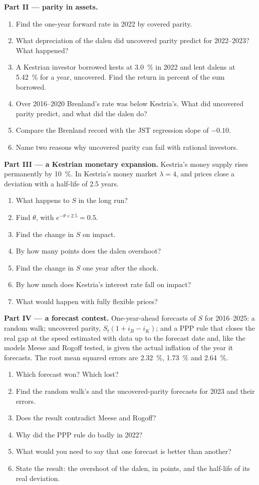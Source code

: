 \begin{problem}
\medskip\noindent\textbf{Part II --- parity in assets.}
\begin{enumerate}[resume]
\item Find the one-year forward rate in 2022 by covered parity.
\item What depreciation of the dalen did uncovered parity predict for 2022--2023?
What happened?
\item A Kestrian investor borrowed kests at 3.0~\% in 2022 and lent dalens at 5.42~\% for
a year, uncovered. Find the return in percent of the sum borrowed.
\item Over 2016--2020 Brenland's rate was below Kestria's. What did uncovered parity
predict, and what did the dalen do?
\item Compare the Brenland record with the JST regression slope of $-0.10$.
\item Name two reasons why uncovered parity can fail with rational investors.
\end{enumerate}

\medskip\noindent\textbf{Part III --- a Kestrian monetary expansion.} Kestria's money
supply rises permanently by 10~\%. In Kestria's money market $\lambda = 4$, and prices
close a deviation with a half-life of 2.5 years.
\begin{enumerate}[resume]
\item What happens to $S$ in the long run?
\item Find $\theta$, with $e^{-\theta \times 2.5} = 0.5$.
\item Find the change in $S$ on impact.
\item By how many points does the dalen overshoot?
\item Find the change in $S$ one year after the shock.
\item By how much does Kestria's interest rate fall on impact?
\item What would happen with fully flexible prices?
\end{enumerate}

\medskip\noindent\textbf{Part IV --- a forecast contest.} One-year-ahead forecasts of
$S$ for 2016--2025: a random walk; uncovered parity, $S_t(1 + i_B - i_K)$; and a PPP
rule that closes the real gap at the speed estimated with data up to the forecast
date and, like the models Meese and Rogoff tested, is given the actual inflation of
the year it forecasts. The root mean squared errors are 2.32~\%, 1.73~\% and 2.64~\%.
\begin{enumerate}[resume]
\item Which forecast won? Which lost?
\item Find the random walk's and the uncovered-parity forecasts for 2023 and their
errors.
\item Does the result contradict Meese and Rogoff?
\item Why did the PPP rule do badly in 2022?
\item What would you need to say that one forecast is better than another?
\item State the result: the overshoot of the dalen, in points, and the half-life of
its real deviation.
\end{enumerate}
\end{problem}
